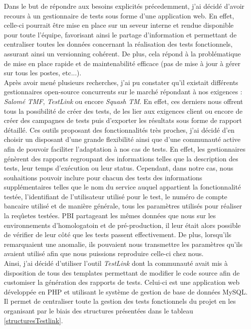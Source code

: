 	Dans le but de répondre aux besoins explicités précedemment, j'ai décidé d'avoir recours à un gestionnaire de tests sous forme d'une application web. En effet, celle-ci pourrait être mise en place sur un seveur interne et rendue disponible pour toute l'équipe, favorisant ainsi le partage d'information et permettant de centraliser toutes les données concernant la réalisation des tests fonctionnels, assurant ainsi un versionning cohérent. De plus, cela répond à la problématique de mise en place rapide et de maintenabilité efficace (pas de mise à jour à gérer sur tous les postes, etc...). \\
	
	Après avoir mené plusieurs recherches, j'ai pu constater qu'il existait différents gestionnaires open-source concurrents sur le marché répondant à nos exigences : \textit{Salomé TMF}, \textit{TestLink} ou encore \textit{Squash TM}. En effet, ces derniers nous offrent tous la possibilité de créer des tests, de les lier aux exigences client ou encore de créer des campagnes de tests puis d'exporter les résultats sous forme de rapport détaillé. Ces outils proposant des fonctionnalités très proches, j'ai décidé d'en choisir un disposant d'une grande flexibilité ainsi que d'une communauté active afin de pouvoir faciliter l'adaptation à nos cas de tests. En effet, les gestionnaires génèrent des rapports regroupant des informations telles que la description des tests, leur temps d'exécution ou leur status. Cependant, dans notre cas, nous souhaitions pouvoir inclure pour chacun des tests des informations supplémentaires telles que le nom du service auquel appartient la fonctionnalité testée, l'identifiant de l'utilisateur utilisé pour le test, le numéro de compte bancaire utilisé et de manière générale, tous les paramètres utilisés pour réaliser la reqûetes testées. PBI partageant les mêmes données que nous sur les environnements d'homologatoin et de pré-production, il leur était alors possible de vérifier de leur côté que les tests passent effectivement. De plus, lorsqu'ils remarquaient une anomalie, ils pouvaient nous transmettre les paramètres qu'ils avaient utilisé afin que nous puissions reproduire celle-ci chez nous. \\
	
	Ainsi, j'ai décidé d'utiliser l'outil \textit{TestLink} dont la communauté avait mis à disposition de tous des templates permettant de modifier le code source afin de customiser la génération des rapports de tests. Celui-ci est une application web développée en PHP et utilisant le système de gestion de base de données MySQL. Il permet de centraliser toute la gestion des tests fonctionnels du projet en les organisant par le biais des structures présentées dans le tableau \ref{structuresTestlink}.
	
